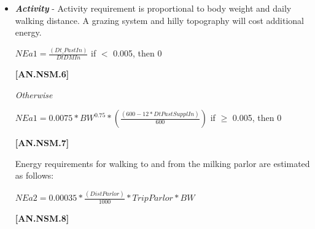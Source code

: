 \documentclass{article}
\begin{document}
\begin{refsection}
\begin{itemize}
\begin{center}
    \(CBW = MW * 0.06275\)
\end{center}
\vspace{0.5cm}
            {\raggedleft \textbf{[AN.NSM.4]}\par}

        \vspace{0.2cm}
        \underline {Heifers}
        For heifers, the maintenance energy requirement is only adjusted for the gravid uterine weight:
        \vspace{0.25cm}

    
\begin{center}
    \(NEmain = 0.10 * (BW - GrUterW)^{0.75}\)
\end{center}
\vspace{0.5cm}
            {\raggedleft \textbf{[AN.NSM.5]}\par}
\vspace{0.25cm}

        \item \textbf{\textit {Activity}} - Activity requirement is proportional to body weight and daily walking distance. A grazing system and hilly topography will cost additional energy. 
        \vspace{0.25cm}

    
\begin{center}
    \(NEa1 = \frac{(Dt\_PastIn)}{DtDMIn}\) if $<$ 0.005, then 0
\end{center}
\vspace{0.5cm}
            {\raggedleft \textbf{[AN.NSM.6]}\par}
            \vspace{0.2cm}
            
\textit{\small Otherwise}

\begin{center}
    \(NEa1 = 0.0075 * BW^{0.75} * ( \frac{(600 - 12 * DtPastSupplIn)}{600})\) if \( \geq \) 0.005, then 0
\end{center}
\vspace{0.5cm}
            {\raggedleft \textbf{[AN.NSM.7]}\par}
            \vspace{0.2cm}

Energy requirements for walking to and from the milking parlor are estimated as follows:
        \vspace{0.25cm}

    
\begin{center}
    \(NEa2 = 0.00035 * \frac{(DistParlor)}{1000} * TripParlor * BW\) 
\end{center}
\vspace{0.5cm}
            {\raggedleft \textbf{[AN.NSM.8]}\par}
            \vspace{0.2cm}


\end{itemize}
\end{refsection}
\end{document}

